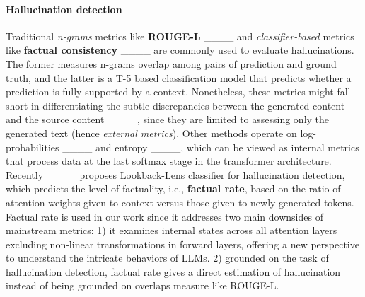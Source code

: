 \paragraph{Hallucination detection}
Traditional \textit{n-grams} metrics like \textbf{ROUGE-L} ____ and \textit{classifier-based} metrics like \textbf{factual consistency} ____ are commonly used to evaluate hallucinations. The former measures n-grams overlap among pairs of prediction and ground truth, and the latter is a T-5 based classification model that predicts whether a prediction is fully supported by a context. Nonetheless, these metrics might fall short in differentiating the subtle discrepancies between the generated content and the source content ____, since they are limited to assessing only the generated text (hence \textit{external metrics}). Other methods operate on log-probabilities ____ and entropy ____, which can be viewed as internal metrics that process data at the last softmax stage in the transformer architecture. 
Recently ____ proposes Lookback-Lens classifier for hallucination detection, which predicts the level of factuality, i.e., \textbf{factual rate}, based on the ratio of attention weights given to context versus those given to newly generated tokens.
Factual rate is used in our work since it addresses two main downsides of mainstream metrics:
1) it examines internal states across all attention layers excluding non-linear transformations in forward layers, offering a new perspective to understand the intricate behaviors of LLMs.
2) grounded on the task of hallucination detection, factual rate gives a direct estimation of hallucination instead of being grounded on overlaps measure like ROUGE-L.


